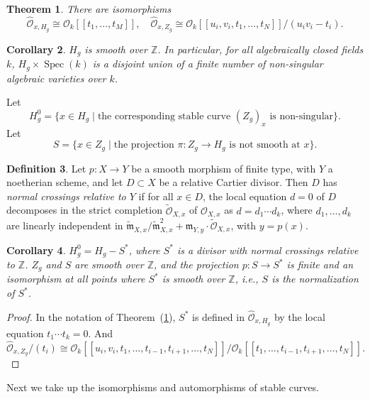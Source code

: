 \documentclass[10pt]{amsart}
\theoremstyle{plain}
\newtheorem{theorem}{Theorem}[section]
\newtheorem{corollary}[theorem]{Corollary}
\theoremstyle{definition}
\newtheorem{definition}[theorem]{Definition}
\DeclareMathOperator{\Spec}{Spec}
\newcommand{\cO}{\mathcal{O}}
\newcommand{\m}{\mathfrak{m}}
\begin{document}
\begin{theorem}\label{thm:1.6}
There are isomorphisms
\[
\widehat{\cO}_{x,H_g} \cong \mathcal{O}_k[[t_1, \ldots, t_M]], \quad \widehat{\cO}_{x,Z_g} \cong \mathcal{O}_k[[u_i, v_i, t_1, \ldots, t_N]]/(u_i v_i - t_i).
\]
\end{theorem}

\begin{corollary}\label{cor:1.7}
$H_g$ is smooth over $\mathbb{Z}$. In particular, for all algebraically closed fields $k$, $H_g \times \Spec(k)$ is a disjoint union of a finite number of non-singular algebraic varieties over $k$.
\end{corollary}

Let
\[
H_g^0 = \{x \in H_g \mid \text{the corresponding stable curve } (Z_g)_x \text{ is non-singular}\}.
\]
Let
\[
S = \{x \in Z_g \mid \text{the projection } \pi: Z_g \to H_g \text{ is not smooth at } x\}.
\]

\begin{definition}\label{def:1.8}
Let $p: X \to Y$ be a smooth morphism of finite type, with $Y$ a noetherian scheme, and let $D \subset X$ be a relative Cartier divisor. Then $D$ has \emph{normal crossings relative to $Y$} if for all $x \in D$, the local equation $d = 0$ of $D$ decomposes in the strict completion $\widetilde{\cO}_{X,x}$ of $\cO_{X,x}$ as $d = d_1 \cdots d_k$, where $d_1, \ldots, d_k$ are linearly independent in $\widetilde{\m}_{X,x}/\widetilde{\m}_{X,x}^2 + \m_{Y,y} \cdot \widetilde{\cO}_{X,x}$, with $y = p(x)$.
\end{definition}

\begin{corollary}\label{cor:1.9}
$H_g^0 = H_g - S^*$, where $S^*$ is a divisor with normal crossings relative to $\mathbb{Z}$. $Z_g$ and $S$ are smooth over $\mathbb{Z}$, and the projection $p: S \to S^*$ is finite and an isomorphism at all points where $S^*$ is smooth over $\mathbb{Z}$, i.e., $S$ is the normalization of $S^*$.
\end{corollary}

\begin{proof}
In the notation of Theorem~(\ref{thm:1.6}), $S^*$ is defined in $\widehat{\cO}_{x,H_g}$ by the local equation $t_1 \cdots t_k = 0$. And
\[
\widehat{\cO}_{x,Z_g} / (t_i) \cong \mathcal{O}_k[[u_i, v_i, t_1, \ldots, t_{i-1}, t_{i+1}, \ldots, t_N]] / \mathcal{O}_k[[t_1, \ldots, t_{i-1}, t_{i+1}, \ldots, t_N]].
\]
\end{proof}

Next we take up the isomorphisms and automorphisms of stable curves.
\end{document}
